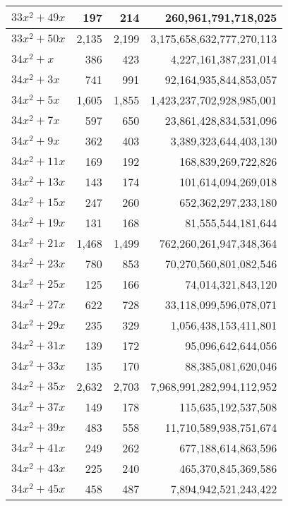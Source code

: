 \documentclass[a4paper]{amsproc}
\theoremstyle{plain}
\begin{document}
\begin{longtable}{ | l | r | r | r | }
$33x^2 + 49x$ & 197 & 214 & 260{,}961{,}791{,}718{,}025 \\ \hline
$33x^2 + 50x$ & 2{,}135 & 2{,}199 & 3{,}175{,}658{,}632{,}777{,}270{,}113 \\ \hline
$34x^2 + x$ & 386 & 423 & 4{,}227{,}161{,}387{,}231{,}014 \\ \hline
$34x^2 + 3x$ & 741 & 991 & 92{,}164{,}935{,}844{,}853{,}057 \\ \hline
$34x^2 + 5x$ & 1{,}605 & 1{,}855 & 1{,}423{,}237{,}702{,}928{,}985{,}001 \\ \hline
$34x^2 + 7x$ & 597 & 650 & 23{,}861{,}428{,}834{,}531{,}096 \\ \hline
$34x^2 + 9x$ & 362 & 403 & 3{,}389{,}323{,}644{,}403{,}130 \\ \hline
$34x^2 + 11x$ & 169 & 192 & 168{,}839{,}269{,}722{,}826 \\ \hline
$34x^2 + 13x$ & 143 & 174 & 101{,}614{,}094{,}269{,}018 \\ \hline
$34x^2 + 15x$ & 247 & 260 & 652{,}362{,}297{,}233{,}180 \\ \hline
$34x^2 + 19x$ & 131 & 168 & 81{,}555{,}544{,}181{,}644 \\ \hline
$34x^2 + 21x$ & 1{,}468 & 1{,}499 & 762{,}260{,}261{,}947{,}348{,}364 \\ \hline
$34x^2 + 23x$ & 780 & 853 & 70{,}270{,}560{,}801{,}082{,}546 \\ \hline
$34x^2 + 25x$ & 125 & 166 & 74{,}014{,}321{,}843{,}120 \\ \hline
$34x^2 + 27x$ & 622 & 728 & 33{,}118{,}099{,}596{,}078{,}071 \\ \hline
$34x^2 + 29x$ & 235 & 329 & 1{,}056{,}438{,}153{,}411{,}801 \\ \hline
$34x^2 + 31x$ & 139 & 172 & 95{,}096{,}642{,}644{,}056 \\ \hline
$34x^2 + 33x$ & 135 & 170 & 88{,}385{,}081{,}620{,}046 \\ \hline
$34x^2 + 35x$ & 2{,}632 & 2{,}703 & 7{,}968{,}991{,}282{,}994{,}112{,}952 \\ \hline
$34x^2 + 37x$ & 149 & 178 & 115{,}635{,}192{,}537{,}508 \\ \hline
$34x^2 + 39x$ & 483 & 558 & 11{,}710{,}589{,}938{,}751{,}674 \\ \hline
$34x^2 + 41x$ & 249 & 262 & 677{,}188{,}614{,}863{,}596 \\ \hline
$34x^2 + 43x$ & 225 & 240 & 465{,}370{,}845{,}369{,}586 \\ \hline
$34x^2 + 45x$ & 458 & 487 & 7{,}894{,}942{,}521{,}243{,}422 \\ \hline

\end{longtable}
\end{document}

